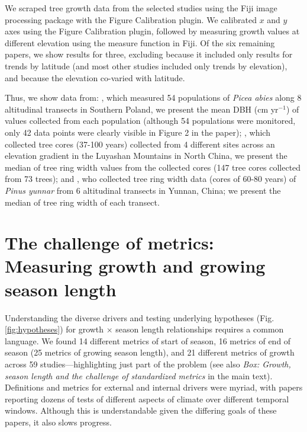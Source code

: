 \documentclass[11pt]{article}
\begin{document}
We scraped tree growth data from the selected studies using the Fiji image processing package with the Figure Calibration plugin. We calibrated $x$ and $y$ axes using the Figure Calibration plugin, followed by measuring growth values at different elevation using the measure function in Fiji. Of the six remaining papers, we show results for three, excluding \citet{huang2010radial} because it included only results for trends by latitude (and most other studies included only trends by elevation), and \citet{cavin2017highest,zhu2018spatial} because the elevation co-varied with latitude. %

Thus, we show data from: \citet{oleksyn1998growth}, which measured 54 populations of  \emph{Picea abies} along 8 altitudinal transects in Southern Poland, we present the mean DBH (cm yr$^{-1}$) of values collected from each population (although 54 populations were monitored, only 42 data points were clearly visible in Figure 2 in the paper); \citet{wang2017climatic}, which collected  tree cores (37-100 years) collected from 4 different sites across an elevation gradient in the Luyashan Mountains in North China, we present the median of tree ring width values from the collected cores (147 tree cores collected from 73 trees); and \citet{zhou2022altitudinal}, who collected tree ring width data (cores of 60-80 years) of \emph{Pinus yunnar} from 6 altitudinal transects in Yunnan, China; we present the median of tree ring width of each transect.

\section*{The challenge of metrics: Measuring growth and growing season length}

Understanding the diverse drivers and testing underlying hypotheses (Fig. \ref{fig:hypotheses}) for growth $\times$ season length relationships requires a common language. We found 14 different metrics of start of season, 16 metrics of end of season (25 metrics of growing season length), and 21 different metrics of growth across 59 studies---highlighting just part of the problem (see also \emph{Box: Growth, season length and the challenge of standardized metrics} in the main text). Definitions and metrics for external and internal drivers were myriad, %
with papers reporting dozens of tests of different aspects of climate over different temporal windows. Although this is understandable given the differing goals of these papers, it also slows progress. 
\end{document}
